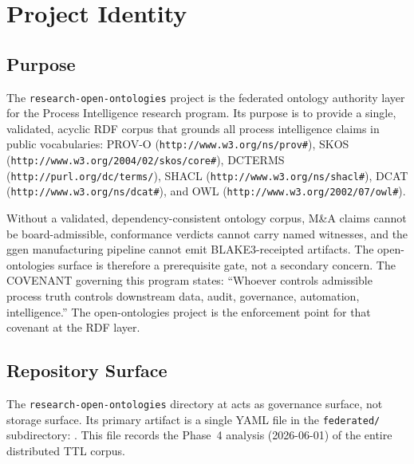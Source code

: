
\section{Project Identity}
\label{sec:research-open-ontologies-identity}

\subsection{Purpose}
\label{sec:research-open-ontologies-purpose}

The \texttt{research-open-ontologies} project is the federated ontology authority layer for the
Process Intelligence research program. Its purpose is to provide a single, validated, acyclic
RDF corpus that grounds all process intelligence claims in public vocabularies: PROV-O
(\texttt{http://www.w3.org/ns/prov\#}), SKOS (\texttt{http://www.w3.org/2004/02/skos/core\#}),
DCTERMS (\texttt{http://purl.org/dc/terms/}), SHACL (\texttt{http://www.w3.org/ns/shacl\#}),
DCAT (\texttt{http://www.w3.org/ns/dcat\#}), and OWL
(\texttt{http://www.w3.org/2002/07/owl\#}).

Without a validated, dependency-consistent ontology corpus, M\&A claims cannot be board-admissible,
conformance verdicts cannot carry named witnesses, and the ggen manufacturing pipeline cannot emit
BLAKE3-receipted artifacts. The open-ontologies surface is therefore a prerequisite gate, not a
secondary concern. The COVENANT governing this program states: ``Whoever controls admissible
process truth controls downstream data, audit, governance, automation, intelligence.'' The
open-ontologies project is the enforcement point for that covenant at the RDF layer.

\subsection{Repository Surface}
\label{sec:research-open-ontologies-surface}

The \texttt{research-open-ontologies} directory at
 acts as governance surface,
not storage surface. Its primary artifact is a single YAML file in the \texttt{federated/}
subdirectory: . This file records the
Phase~4 analysis (2026-06-01) of the entire distributed TTL corpus.


